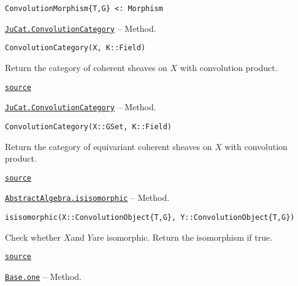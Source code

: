 \documentclass{memoir}
\begin{document}
\begin{lstlisting}
ConvolutionMorphism{T,G} <: Morphism
\end{lstlisting}


\hypertarget{11439898130865602624}{} 
\hyperlink{11439898130865602624}{\texttt{JuCat.ConvolutionCategory}}  -- {Method.}

\begin{adjustwidth}{2em}{0pt}


\begin{verbatim}
ConvolutionCategory(X, K::Field)
\end{verbatim}

Return the category of coherent sheaves on \(X\) with convolution product.



\href{https://github.com/FabianMaeurer/JuCat.jl/blob/367390e2d003deec2ababa73caeab405e934bb35/src/structures/ConvolutionCategory/ConvolutionCategory.jl#L45-L49}{\texttt{source}}


\end{adjustwidth}
\hypertarget{13116209171061471445}{} 
\hyperlink{13116209171061471445}{\texttt{JuCat.ConvolutionCategory}}  -- {Method.}

\begin{adjustwidth}{2em}{0pt}


\begin{verbatim}
ConvolutionCategory(X::GSet, K::Field)
\end{verbatim}

Return the category of equivariant coherent sheaves on \(X\) with convolution product.



\href{https://github.com/FabianMaeurer/JuCat.jl/blob/367390e2d003deec2ababa73caeab405e934bb35/src/structures/ConvolutionCategory/ConvolutionCategory.jl#L23-L27}{\texttt{source}}


\end{adjustwidth}
\hypertarget{15935237061258954038}{} 
\hyperlink{15935237061258954038}{\texttt{AbstractAlgebra.isisomorphic}}  -- {Method.}

\begin{adjustwidth}{2em}{0pt}


\begin{verbatim}
isisomorphic(X::ConvolutionObject{T,G}, Y::ConvolutionObject{T,G})
\end{verbatim}

Check whether \(X\)and \(Y\)are isomorphic. Return the isomorphism if true.



\href{https://github.com/FabianMaeurer/JuCat.jl/blob/367390e2d003deec2ababa73caeab405e934bb35/src/structures/ConvolutionCategory/ConvolutionCategory.jl#L85-L89}{\texttt{source}}


\end{adjustwidth}
\hypertarget{11329682958942309008}{} 
\hyperlink{11329682958942309008}{\texttt{Base.one}}  -- {Method.}
\end{document}

